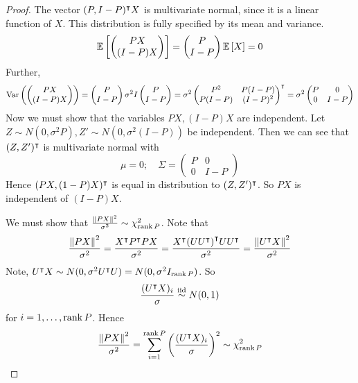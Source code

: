 \begin{proof}
	The vector \( (P, I-P)^\intercal X \) is multivariate normal, since it is a linear function of \( X \).
	This distribution is fully specified by its mean and variance.
	\[
		\mathbb{E}\left[{\begin{pmatrix}
				PX \\
				(I-P)X
			\end{pmatrix}}\right] = \begin{pmatrix}
			P \\
			I-P
		\end{pmatrix} \mathbb{E}\left[{X}\right] = 0
	\]
	Further,
	\[
		\operatorname{Var}\left({\begin{pmatrix}
				PX \\
				(I-P)X
			\end{pmatrix}}\right) = \begin{pmatrix}
			P \\
			I - P
		\end{pmatrix} \sigma^2 I \begin{pmatrix}
			P \\
			I - P
		\end{pmatrix} = \sigma^2 \begin{pmatrix}
			P^2    & P(I-P)  \\
			P(I-P) & (I-P)^2
		\end{pmatrix}^\intercal = \sigma^2 \begin{pmatrix}
			P & 0   \\
			0 & I-P
		\end{pmatrix}
	\]
	Now we must show that the variables \( PX, (I-P)X \) are independent.
	Let \( Z \sim N(0,\sigma^2 P), Z' \sim N(0,\sigma^2(I-P)) \) be independent.
	Then we can see that \( (Z, Z')^\intercal \) is multivariate normal with
	\[
		\mu = 0;\quad \Sigma = \begin{pmatrix}
			P & 0     \\
			0 & I - P
		\end{pmatrix}
	\]
	Hence \( (PX, (1-P)X)^\intercal \) is equal in distribution to \( (Z, Z')^\intercal \).
	So \( PX \) is independent of \( (I-P)X \).

	We must show that \( \frac{\norm{PX}^2}{\sigma^2} \sim \chi^2_{\rank P} \).
	Note that
	\[
		\frac{\norm{PX}^2}{\sigma^2} = \frac{X^\intercal P^\intercal P X}{\sigma^2} = \frac{X^\intercal \qty(U U^\intercal)^\intercal U U^\intercal}{\sigma^2} = \frac{\norm{U^\intercal X}^2}{\sigma^2}
	\]
	Note, \( U^\intercal X \sim N(0,\sigma^2 U^\intercal U) = N(0,\sigma^2 I_{\rank P}) \).
	So
	\[
		\frac{(U^\intercal X)_i}{\sigma} \overset{\text{iid}}{\sim} N(0,1)
	\]
	for \( i = 1, \dots, \rank P \).
	Hence
	\[
		\frac{\norm{PX}^2}{\sigma^2} = \sum_{i=1}^{\rank P} \qty(\frac{(U^\intercal X)_i}{\sigma})^2 \sim \chi^2_{\rank P}
	\]
\end{proof}
